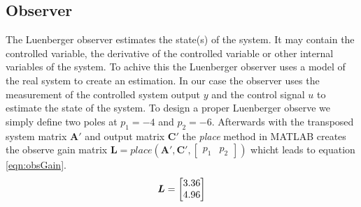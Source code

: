 \subsection{Observer} \label{subsec:observer}
The Luenberger observer estimates the state(s) of the system. It may contain the controlled variable, the derivative of the controlled variable or other internal variables of the system. To achive this the Luenberger observer uses a model of the real system to create an estimation. In our case the observer uses the measurement of the controlled system output $y$ and the control signal $u$ to estimate the state of the system. To design a proper Luenberger observe we simply define two poles at $p_1 = -4$ and $p_2 = -6$. Afterwards with the transposed system matrix $\boldsymbol{A}'$ and output matrix $\boldsymbol{C}'$ the \textit{place} method in MATLAB creates the observe gain matrix $\boldsymbol{L} = place(\boldsymbol{A}',\boldsymbol{C}',\begin{bmatrix} p_1 & p_2 \end{bmatrix})$ whicht leads to equation \ref{eqn:obsGain}.
\begin{equation}
    \boldsymbol{L} = \begin{bmatrix} 3.36 \cr 4.96 \end{bmatrix} 
    \label{eqn:obsGain}
\end{equation}